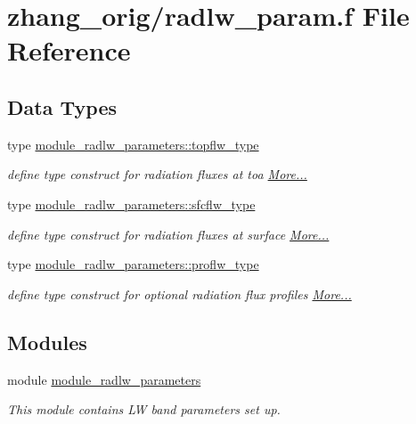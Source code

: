\hypertarget{zhang__orig_2radlw__param_8f}{}\section{zhang\+\_\+orig/radlw\+\_\+param.f File Reference}
\label{zhang__orig_2radlw__param_8f}
\subsection*{Data Types}
\begin{DoxyCompactItemize}
\item 
type \hyperlink{namespacemodule__radlw__parameters_structmodule__radlw__parameters_1_1topflw__type}{module\+\_\+radlw\+\_\+parameters\+::topflw\+\_\+type}
\begin{DoxyCompactList}\small\item\em define type construct for radiation fluxes at toa  \hyperlink{namespacemodule__radlw__parameters_structmodule__radlw__parameters_1_1topflw__type}{More...}\end{DoxyCompactList}\item 
type \hyperlink{group__module__radlw__main_structmodule__radlw__parameters_1_1sfcflw__type}{module\+\_\+radlw\+\_\+parameters\+::sfcflw\+\_\+type}
\begin{DoxyCompactList}\small\item\em define type construct for radiation fluxes at surface  \hyperlink{group__module__radlw__main_structmodule__radlw__parameters_1_1sfcflw__type}{More...}\end{DoxyCompactList}\item 
type \hyperlink{group__module__radlw__main_structmodule__radlw__parameters_1_1proflw__type}{module\+\_\+radlw\+\_\+parameters\+::proflw\+\_\+type}
\begin{DoxyCompactList}\small\item\em define type construct for optional radiation flux profiles  \hyperlink{group__module__radlw__main_structmodule__radlw__parameters_1_1proflw__type}{More...}\end{DoxyCompactList}\end{DoxyCompactItemize}
\subsection*{Modules}
\begin{DoxyCompactItemize}
\item 
module \hyperlink{namespacemodule__radlw__parameters}{module\+\_\+radlw\+\_\+parameters}
\begin{DoxyCompactList}\small\item\em This module contains LW band parameters set up. \end{DoxyCompactList}\end{DoxyCompactItemize}


